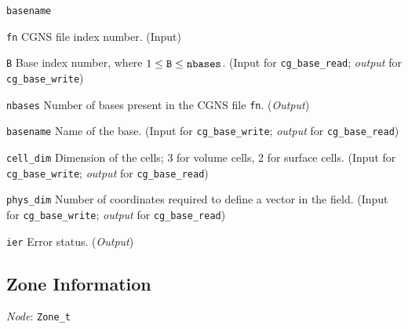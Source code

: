 \begin{Ventryi}{\texttt{basename}}\raggedright
\item [\texttt{fn}]
      CGNS file index number.
      (\textcolor{input}{Input})
\item [\texttt{B}]
      Base index number, where $1 \leq \text{\texttt{B}} \leq \text{\texttt{nbases}}$.
      (\textcolor{input}{Input} for \texttt{cg\_base\_read};
      \textcolor{output}{\textit{output}} for \texttt{cg\_base\_write})
\item [\texttt{nbases}]
      Number of bases present in the CGNS file \texttt{fn}.
      (\textcolor{output}{\textit{Output}})
\item [\texttt{basename}]
      Name of the base.
      (\textcolor{input}{Input} for \texttt{cg\_base\_write};
      \textcolor{output}{\textit{output}} for \texttt{cg\_base\_read})
\item [\texttt{cell\_dim}]
      Dimension of the cells; 3 for volume cells, 2 for surface cells.
      (\textcolor{input}{Input} for \texttt{cg\_base\_write};
      \textcolor{output}{\textit{output}} for \texttt{cg\_base\_read})
\item [\texttt{phys\_dim}]
      Number of coordinates required to define a vector in the field.
      (\textcolor{input}{Input} for \texttt{cg\_base\_write};
      \textcolor{output}{\textit{output}} for \texttt{cg\_base\_read})
\item [\texttt{ier}]
      Error status.
      (\textcolor{output}{\textit{Output}})
\end{Ventryi}

\subsection{Zone Information}
\label{s:zone}

\noindent
\textit{Node}: \texttt{Zone\_t}

